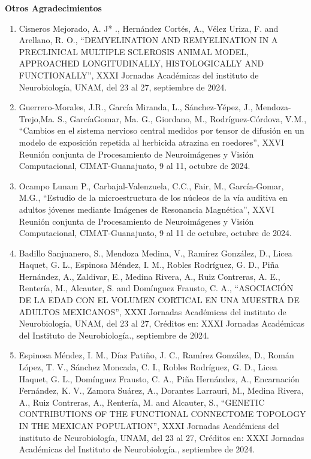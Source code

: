\textbf{Otros Agradecimientos}

\hfill

\begin{enumerate}

\item Cisneros Mejorado, A. J* ., Hernández Cortés, A., Vélez Uriza, F. and Arellano, R. O., “DEMYELINATION AND REMYELINATION 
IN A PRECLINICAL MULTIPLE SCLEROSIS ANIMAL MODEL, APPROACHED LONGITUDINALLY, HISTOLOGICALLY AND FUNCTIONALLY”, XXXI 
Jornadas Académicas del instituto de Neurobiología, UNAM, del 23 al 27, septiembre 
de 2024.

\item Guerrero-Morales, J.R., García Miranda, L., Sánchez-Yépez, J., Mendoza-Trejo,Ma. S., GarcíaGomar, Ma. G., Giordano, M., 
Rodríguez-Córdova, V.M., “Cambios en el sistema nervioso central medidos por tensor de difusión en un modelo de exposición 
repetida al herbicida atrazina en roedores”, XXVI Reunión conjunta de Procesamiento de Neuroimágenes y Visión 
Computacional, CIMAT-Guanajuato, 9 al 11, octubre de 2024.

\item Ocampo Lunam P., Carbajal-Valenzuela, C.C., Fair, M., García-Gomar, M.G., “Estudio de la microestructura de los núcleos 
de la vía auditiva en adultos jóvenes mediante Imágenes de Resonancia Magnética”, XXVI Reunión conjunta de Procesamiento de 
Neuroimágenes y Visión Computacional, CIMAT-Guanajuato, 9 al 11 de octubre, octubre de 
2024.

\item Badillo Sanjuanero, S., Mendoza Medina, V., Ramírez González, D., Licea Haquet, G. L., Espinosa Méndez, I. M., Robles 
Rodríguez, G. D., Piña Hernández, A., Zaldivar, E., Medina Rivera, A., Ruiz Contreras, A. E., Rentería, M., Alcauter, S. 
and Domínguez Frausto, C. A., “ASOCIACIÓN DE LA EDAD CON EL VOLUMEN CORTICAL EN UNA MUESTRA DE ADULTOS MEXICANOS”, XXXI 
Jornadas Académicas del instituto de Neurobiología, UNAM, del 23 al 27, Créditos en: XXXI Jornadas Académicas del Instituto 
de Neurobiología., septiembre de 2024.

\item Espinosa Méndez, I. M., Díaz Patiño, J. C., Ramírez González, D., Román López, T. V., Sánchez Moncada, C. I., Robles 
Rodríguez, G. D., Licea Haquet, G. L., Domínguez Frausto, C. A., Piña Hernández, A., Encarnación Fernández, K. V., Zamora 
Suárez, A., Dorantes Larrauri, M., Medina Rivera, A., Ruiz Contreras, A., Rentería, M. and Alcauter, S., “GENETIC 
CONTRIBUTIONS OF THE FUNCTIONAL CONNECTOME TOPOLOGY IN THE MEXICAN POPULATION”, XXXI Jornadas Académicas del instituto de 
Neurobiología, UNAM, del 23 al 27, Créditos en: XXXI Jornadas Académicas del Instituto de Neurobiología., septiembre de 
2024.


\end{enumerate}
